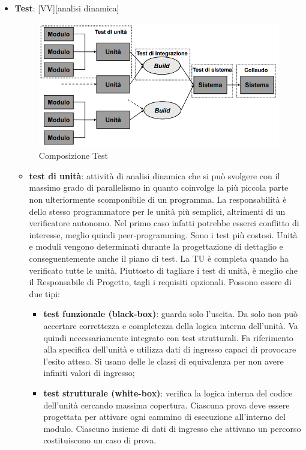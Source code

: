\begin{itemize}
		\item \textbf{Test}: [VV][analisi dinamica]
			\begin{figure}[htbp]
				\centering
				\includegraphics[scale=0.5]{img/composizione_test.png}
				\caption{Composizione Test}
				\label{fig:comp_test}
			\end{figure}

			\begin{itemize}
				\item \textbf{test di unità}: attività di analisi dinamica che si può svolgere con il massimo grado di parallelismo in quanto coinvolge la più piccola parte non ulteriormente scomponibile di un programma. La responsabilità è dello stesso programmatore per le unità più semplici, altrimenti di un verificatore autonomo. Nel primo caso infatti potrebbe esserci conflitto di interesse, meglio quindi peer-programming. Sono i test più costosi. Unità e moduli vengono determinati durante la progettazione di dettaglio e conseguentemente anche il piano di test. La TU è completa quando ha verificato tutte le unità. Piuttosto di tagliare i test di unità, è meglio che il Responsabile di Progetto, tagli i requisiti opzionali. Possono essere di due tipi:
					\begin{itemize}
						\item \textbf{test funzionale (black-box)}: guarda solo l'uscita. Da solo non può accertare correttezza e completezza della logica interna dell'unità. Va quindi necessariamente integrato con test strutturali. Fa riferimento alla specifica dell'unità e utilizza dati di ingresso capaci di provocare l'esito atteso. Si usano delle le classi di equivalenza per non avere infiniti valori di ingresso;
						\item \textbf{test strutturale (white-box)}: verifica la logica interna del codice dell'unità cercando massima copertura. Ciascuna prova deve essere progettata per attivare ogni cammino di esecuzione all'interno del modulo. Ciascuno insieme di dati di ingresso che attivano un percorso costituiscono un caso di prova.
					\end{itemize}


\end{itemize}
\end{itemize}
